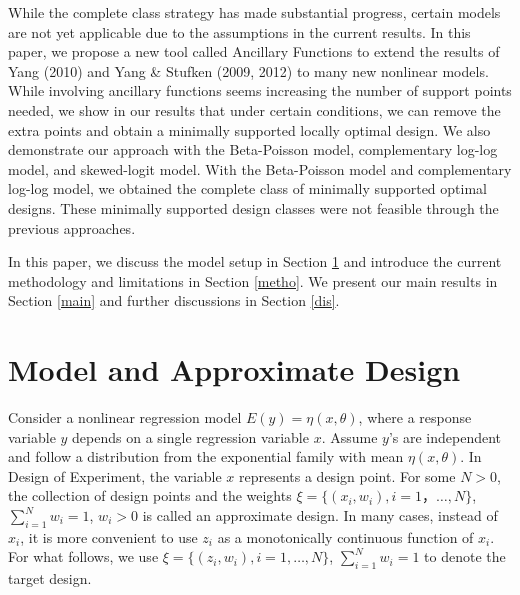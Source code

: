 \documentclass[12pt]{TD-CJS}
\begin{document}

While the complete class strategy has made substantial progress, certain models are not yet applicable due to the assumptions in the current results. In this paper, we propose a new tool called Ancillary Functions to extend the results of Yang (2010) and Yang \& Stufken (2009, 2012) to many new nonlinear models. While involving ancillary functions seems increasing the number of support points needed, we show in our results that under certain conditions, we can remove the extra points and obtain a minimally supported locally optimal design. We also demonstrate our approach with the Beta-Poisson model, complementary log-log model, and skewed-logit model. With the Beta-Poisson model and complementary log-log model, we obtained the complete class of minimally supported optimal designs. These minimally supported design classes were not feasible through the previous approaches.  
 
In this paper, we discuss the model setup in Section \ref{2} and introduce the current methodology and limitations in Section \ref{metho}. We present our main results in Section \ref{main} and further discussions in Section \ref{dis}. 

\section{Model and Approximate Design}\label{2}
Consider a nonlinear regression model $ E(y) = \eta(x,\theta)$, where a response variable $y$ depends on a single regression variable $x$. Assume $y$'s are independent and follow a distribution from the exponential family with mean  $\eta(x,\theta)$. In Design of Experiment, the variable $x$ represents a design point. For some $N>0$, the collection of design points and the weights $\xi = \{(x_i,w_i), i=1， \ldots,
N\}$, $\sum_{i=1}^Nw_i = 1$, $w_i> 0$ is called an approximate design. In many cases, instead of $x_i$, it is more convenient to use $z_i$ as a monotonically continuous function of $x_i$. For what follows, we use $\xi = \{(z_i,w_i), i=1, \ldots,N\}$, $\sum_{i=1}^Nw_i = 1$ to denote the target design. 
\end{document}
